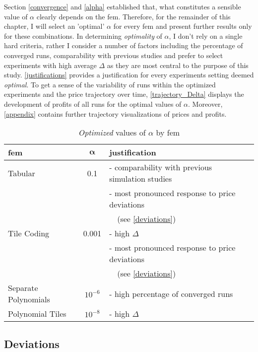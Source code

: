Section \ref{convergence} and \autoref{alpha} established that, what constitutes a sensible value of $\alpha$ clearly depends on the \gls{fem}. Therefore, for the remainder of this chapter, I will select an 'optimal' $\alpha$ for every \gls{fem} and present further results only for these combinations. In determining \emph{optimality} of $\alpha$, I don't rely on a single hard criteria, rather I consider a number of factors including the percentage of converged runs, comparability with previous studies and prefer to select experiments with high average $\Delta$ as they are most central to the purpose of this study. \autoref{justifications} provides a justification for every experiments setting deemed \emph{optimal}. To get a sense of the variability of runs within the optimized experiments and the price trajectory over time, \autoref{trajectory_Delta} displays the development of profits of all runs for the optimal values of $\alpha$. Moreover, \autoref{appendix} contains further trajectory visualizations of prices and profits.


	\begin{table}
		\centering
		\begin{tabular}{|l|c|l|}
			\hline
			\textbf{\gls{fem}}&$\boldsymbol{\alpha}$&\textbf{justification} \\
			\hline
			Tabular&0.1&- comparability with previous simulation studies \\
			&&- most pronounced response to price deviations \\
			&& \ \ (see \autoref{deviations}) \\
			\hline
			Tile Coding&0.001&- high $\Delta$ \\
			&&- most pronounced response to price deviations \\
			&&\ \ (see \autoref{deviations}) \\
			\hline
			Separate Polynomials&$10^{-6}$&- high percentage of converged runs \\
			\hline
			Polynomial Tiles&$10^{-8}$&- high $\Delta$ \\
			\hline
		\end{tabular}
		\caption{\emph{Optimized} values of $\alpha$ by \gls{fem}}
		\label{justifications}
	\end{table}



\subsection{Deviations}\label{deviations}

